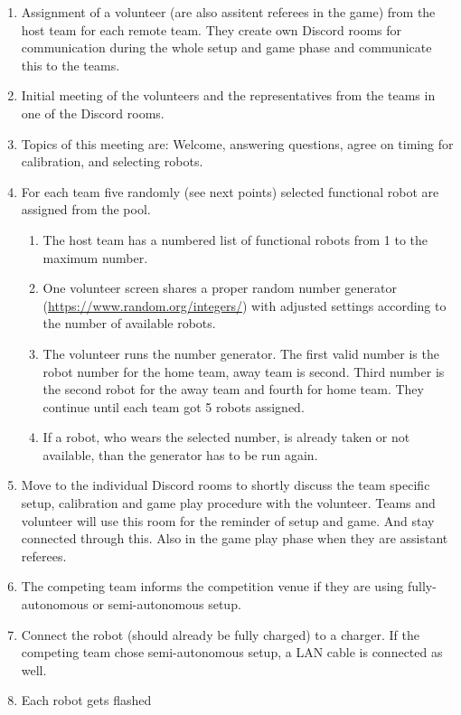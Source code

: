     \begin{enumerate}
        \item Assignment of a volunteer (are also assitent referees in the game) from the host team for each remote team. They create own Discord rooms for communication during the whole setup and game phase and communicate this to the teams.
        \item Initial meeting of the volunteers and the representatives from the teams in one of the Discord rooms.
        \item Topics of this meeting are: Welcome, answering questions, agree on timing for calibration, and selecting robots.
		\item For each team five randomly (see next points) selected functional robot are assigned from the pool.
		\begin{enumerate}
            \item The host team has a numbered list of functional robots from 1 to the maximum number.
            \item One volunteer screen shares a proper random number generator (\url{https://www.random.org/integers/}) with adjusted settings according to the number of available robots.
            \item The volunteer runs the number generator. The first valid number is the robot number for the home team, away team is second. Third number is the second robot for the away team and fourth for home team. They continue until each team got 5 robots assigned. 
            \item If a robot, who wears the selected number, is already taken or not available, than the generator has to be run again. 
        \end{enumerate} 
        \item Move to the individual Discord rooms to shortly discuss the team specific setup, calibration and game play procedure with the volunteer. Teams and volunteer will use this room for the reminder of setup and game. And stay connected through this. Also in the game play phase when they are assistant referees.
        \item The competing team informs the competition venue if they are using fully-autonomous or semi-autonomous setup.
        \item Connect the robot (should already be fully charged) to a charger. If the competing team chose semi-autonomous setup, a LAN cable is connected as well.
        \item Each robot gets flashed 

\end{enumerate}
